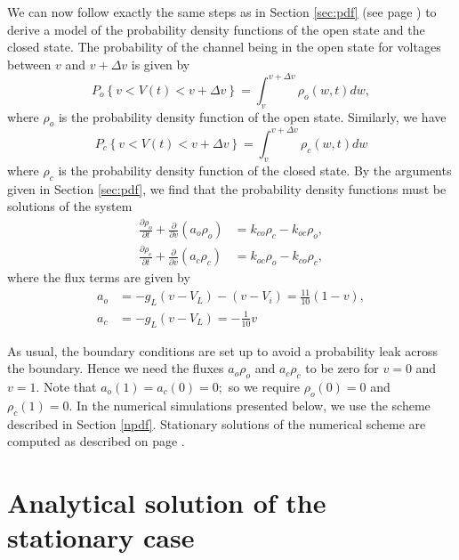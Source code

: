 We can now follow exactly the same steps as in Section \ref{sec:pdf} (see page
\pageref{sec:pdf}) to derive a model of the probability density
functions of the open state and the closed state. The probability of the
channel being in the open state for voltages between $v$ and $v+\Delta v$ is
given by
\[
P_{o}\left\{  v<V(t)<v+\Delta v\right\}  =\int_{v}^{v+\Delta v}\rho_{o}(w,t)dw,
\]
where $\rho_{o}$ is the probability density function of the open state.
Similarly, we have
\[
P_{c}\left\{  v<V(t)<v+\Delta v\right\}  =\int_{v}^{v+\Delta v}\rho_{c}(w,t)dw
\]
where $\rho_{c}$ is the probability density function of the closed state. By
the arguments given in Section \ref{sec:pdf}, we find that the probability
density functions must be solutions of the system
\begin{align}
\frac{\partial\rho_{o}}{\partial t}+\frac{\partial}{\partial v}\left(
a_{o}\rho_{o}\right)   &  =k_{co}\rho_{c}-k_{oc}\rho_{o},\label{vpdf}\\
\frac{\partial\rho_{c}}{\partial t}+\frac{\partial}{\partial v}\left(
a_{c}\rho_{c}\right)   &  =k_{oc}\rho_{o}-k_{co}\rho_{c},\nonumber
\end{align}
where the flux terms are given by
\begin{align}
a_{o} &  =-g_{L}\left(  v-V_{L}\right)  -(v-V_{i})=\frac{11}{10}\left(
1-v\right)  ,\label{vflux}\\
a_{c} &  =-g_{L}\left(  v-V_{L}\right)  =-\frac{1}{10}v\nonumber
\end{align}



As usual, the boundary conditions are set up to avoid a probability leak
across the boundary. Hence we need the  fluxes $a_{o}\rho_{o}$ and
$a_{c}\rho_{c}$ to be zero for $v=0$ and $v=1.$ Note that $a_{o}
(1)=a_{c}(0)=0;$ so we require $\rho_{o}(0)=0$ and $\rho_{c}(1)=0.$ In
the numerical simulations presented below, we use the scheme described in
Section \ref{npdf}. Stationary solutions of the numerical scheme are computed
as described on page \pageref{accuracy}.


\section{Analytical solution of the stationary case}

